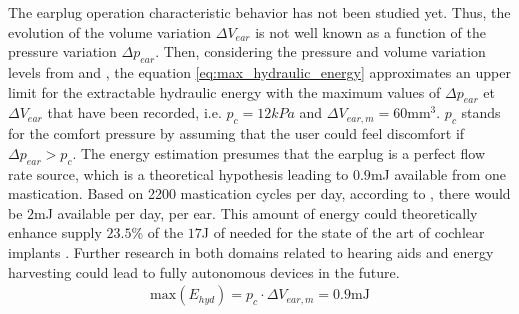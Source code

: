 \documentclass[3p,twocolumn,preprint]{elsarticle}
\begin{document}
The earplug operation characteristic behavior has not been studied yet. Thus, the evolution of the volume variation $\Delta V_{ear}$ is not well known as a function of the pressure variation $\Delta p_{ear}$. Then, considering the pressure and volume variation levels from \cite{Delnavaz2012} and \cite{Bouchard-Roy2020}, the equation \ref{eq:max_hydraulic_energy} approximates an upper limit for the extractable hydraulic energy with the maximum values of $\Delta p_{ear}$ et $\Delta V_{ear}$ that have been recorded, i.e. $p_c=12kPa$ and $\Delta V_{ear,m}=60$mm$^3$. $p_c$ stands for the comfort pressure by assuming that the user could feel discomfort if $\Delta p_{ear}>p_c$. The energy estimation presumes that the earplug is a perfect flow rate source, which is a theoretical hypothesis leading to $0.9$mJ available from one mastication. Based on 2200 mastication cycles per day, according to \cite{Goll2011}, there would be $2$mJ available per day, per ear. This amount of energy could theoretically enhance supply $23.5$\% of the $17$J of needed for the state of the art of cochlear implants \cite{Kulah2022}. Further research in both domains related to hearing aids and energy harvesting could lead to fully autonomous devices in the future.
\begin{align}
	\text{max}(E_{hyd}) = p_c \cdot \Delta V_{ear,m} = 0.9\text{mJ}
	\label{eq:max_hydraulic_energy}
\end{align}

\end{document}
